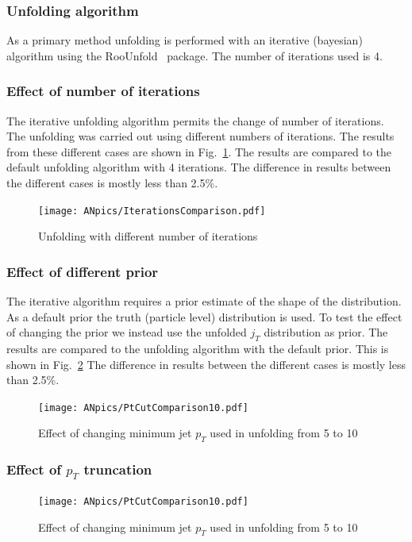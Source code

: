 \subsubsection{Unfolding algorithm}
As a primary method unfolding is performed with an iterative (bayesian) algorithm using the RooUnfold~\cite{roounfold} package. The number of iterations used is 4. 

\subsubsection{Effect of number of iterations}
\label{sec:iterations}
The iterative unfolding algorithm permits the change of number of iterations. The unfolding was carried out using different numbers of iterations. The results from these different cases are shown in Fig.~\ref{fig:iterations}. The results are compared to the default unfolding algorithm with 4 iterations. The difference in results between the different cases is mostly less than 2.5\%.
\begin{figure}
\texttt{[image: ANpics/IterationsComparison.pdf]}
\caption{Unfolding with different number of iterations}
\label{fig:iterations}
\end{figure}

\subsubsection{Effect of different prior}
\label{sec:prior}
The iterative algorithm requires a prior estimate of the shape of the distribution. As a default prior the truth (particle level) distribution is used. To test the effect of changing the prior we instead use the unfolded $j_T$ distribution as prior. The results are compared to the unfolding algorithm with the default prior. This is shown in Fig.~\ref{fig:prior} The difference in results between the different cases is mostly less than 2.5\%. 
\begin{figure}
\texttt{[image: ANpics/PtCutComparison10.pdf]}
\caption{Effect of changing minimum jet $p_T$ used in unfolding from 5 to 10 \gev}
\label{fig:prior}
\end{figure}

\subsubsection{Effect of $p_T$ truncation}
\label{sec:truncation}
\begin{figure}
\texttt{[image: ANpics/PtCutComparison10.pdf]}
\caption{Effect of changing minimum jet $p_T$ used in unfolding from 5 to 10 \gev}
\label{fig:truncation}
\end{figure}

